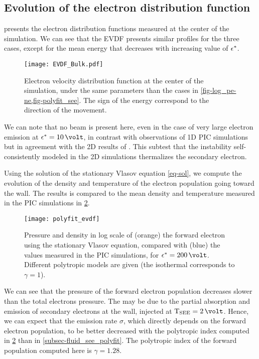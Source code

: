 \subsection{Evolution of the electron distribution function} \label{subsec-EVDF_see_polyfit}

 presents the electron distribution functions measured at the center of the simulation. 
We can see that the \ac{EVDF} presents similar profiles for the three cases, except for the mean energy that decreases with increasing value of $\epsilon^{*}$.

\begin{figure}[hbtp]
  \centering
  \texttt{[image: EVDF\_Bulk.pdf]}
  \caption{Electron velocity distribution function at the center of the simulation, under the same parameters than the cases in \cref{fig-log_pe-ne,fig-polyfit_see}. The sign of the energy correspond to the direction of the movement.}
  \label{fig-evdf_epsstar}
\end{figure}


We can note that no beam is present here, even in the case of very large electron emission at $\crover=10\,\volt$, in contrast with observations of \ac{1D} PIC simulations \citep{sydorenko2006b,sydorenko2007} but in agreement with the \ac{2D} results of \citet{heron2013}.
This subtest that the instability self-consistently modeled in the \ac{2D} simulations thermalizes the secondary electron.

Using the solution of the stationary Vlasov equation \cref{eq-sol}, we compute the evolution of the density and temperature of the electron population going toward the wall.
The results is compared to the mean density and temperature measured in the \ac{PIC} simulations in \cref{fig-evdf_polyfit}.

\begin{figure}[hbtp]
  \centering
  \texttt{[image: polyfit\_evdf]}
  \caption{Pressure and density in log scale of (orange) the forward electron using the stationary Vlasov equation, compared with (blue) the values measured in the \ac{PIC} simulations, for $\crover=200\,\volt$. Different polytropic models are given (the isothermal corresponds to $\gamma=1$).}
  \label{fig-evdf_polyfit}
\end{figure}

We can see that the pressure of the forward electron population decreases slower than the total electrons pressure.
The may be due to the partial absorption and emission of secondary electrons at the wall, injected at $\Tsee=2\,\volt$.
Hence, we can expect that the emission rate $\sigma$, which directly depends on the forward electron population, to be better decreased with the polytropic index computed in \cref{fig-evdf_polyfit} than in \cref{subsec-fluid_see_polyfit}.
The polytropic index of the forward population computed here is $\gamma=1.28$.

